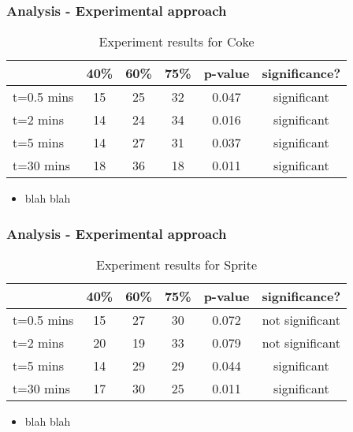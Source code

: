 \documentclass[compress,handout,10pt]{beamer}
\let\olditem\item
\renewcommand{\item}{\setlength{\itemsep}{0.5\baselineskip}\olditem}
\begin{document}
\begin{frame}
    \frametitle{Analysis - Experimental approach}
\begin{table}[ h]
\centering
\begin{tabular}{ l || c|c|c||c|c }
  &40\% &60\% & 75\% &p-value &significance? \\
\hline  
t=0.5 mins & 15 & 25 & 32 & 0.047&significant\\ 
\hline  
t=2 mins & 14 & 24 & 34&0.016&significant\\ 
\hline  
t=5 mins & 14 & 27 & 31&0.037&significant\\ 
\hline  
t=30 mins & 18 & 36 & 18&0.011&significant\\ 
\hline     
 \end{tabular}
\caption{Experiment results for Coke}
\end{table}

\begin{itemize}
\item blah blah
\end{itemize}
\end{frame}


\begin{frame}
    \frametitle{Analysis - Experimental approach}
\begin{table}[ h]
\centering
\begin{tabular}{ l || c|c|c||c|c }
  &40\% &60\% & 75\% &p-value &significance? \\
\hline  
t=0.5 mins & 15 & 27 & 30&0.072&not significant\\ 
\hline  
t=2 mins & 20 & 19 & 33&0.079&not significant\\ 
\hline  
t=5 mins & 14 & 29 & 29&0.044&significant\\ 
\hline  
t=30 mins & 17 & 30 & 25&0.011&significant\\ 
\hline  
 \end{tabular}
\caption{Experiment results for Sprite}
\end{table}

\begin{itemize}
\item blah blah
\end{itemize}
\end{frame}
\end{document}
